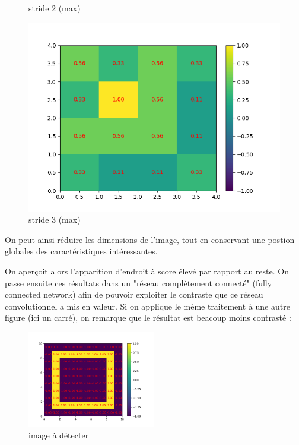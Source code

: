 \begin{figure}[h]
        \caption{stride 2 (max)}
    \endminipage\hfill
        \includegraphics[width=\textwidth]{img/cnn_exemple/cross/stride_3_max.png}
        \caption{stride 3 (max)}
    \endminipage
\end{figure}

On peut ainsi réduire les dimensions de l'image, tout en conservant une postion globales des caractéristiques intéressantes.

On aperçoit alors l'apparition d'endroit à score élevé par rapport au reste.
On passe ensuite ces résultats dans un "réseau complètement connecté" (fully connected network) 
afin de pouvoir exploiter le contraste que ce réseau convolutionnel a mis en valeur.
Si on applique le même traitement à une autre figure (ici un carré), on remarque que le résultat est beacoup moins contrasté : 

\newpage

\begin{figure}[h]
    \center
    \includegraphics[width=0.5\textwidth]{img/cnn_exemple/square/image_carre.png}
    \caption{image à détecter}
\end{figure}


